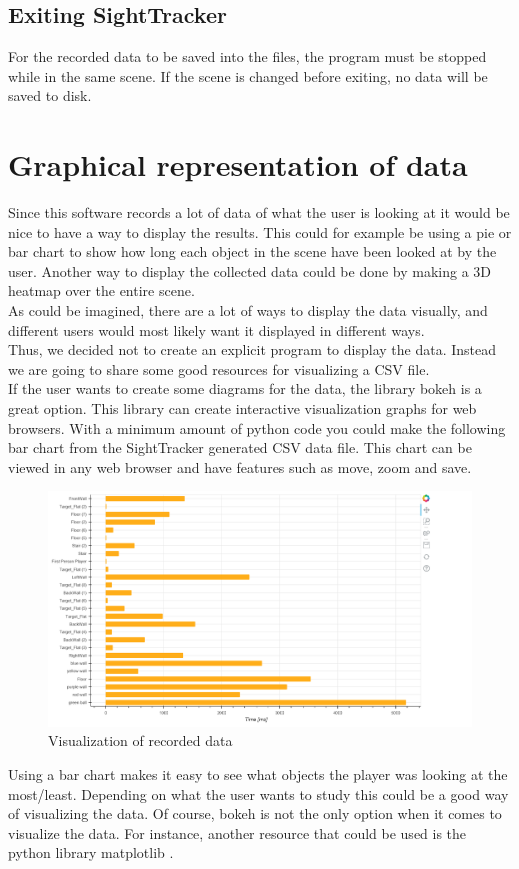 \documentclass[letterpaper]{article}
\begin{document}
\subsection{Exiting SightTracker}
For the recorded data to be saved into the files, the program must be stopped while in the same scene. If the scene is changed before exiting, no data will be saved to disk.
\section{Graphical representation of data}
Since this software records a lot of data of what the user is looking at it would be nice to have a way to display the results. This could for example be using a pie or bar chart to show how long each object in the scene have been looked at by the user. Another way to display the collected data could be done by making a 3D heatmap over the entire scene.\\[0.15in]
As could be imagined, there are a lot of ways to display the data visually, and different users would most likely want it displayed in different ways.\\[0.15in]
Thus, we decided not to create an explicit program to display the data. Instead we are going to share some good resources for visualizing a CSV file.\\[0.15in]
If the user wants to create some diagrams for the data, the library bokeh \cite{bokeh} is a great option. This library can create interactive visualization graphs for web browsers. With a minimum amount of python code you could make the following bar chart from the SightTracker generated CSV data file. This chart can be viewed in any web browser and have features such as move, zoom and save.
\newpage
\begin{figure}[h!]
  \centering \includegraphics[keepaspectratio,scale=0.3]{GraphStuff.png}
  \caption{Visualization of recorded data}
  \label{fig:graphvisualization}
\end{figure}
\noindent Using a bar chart makes it easy to see what objects the player was looking at the most/least. Depending on what the user wants to study this could be a good way of visualizing the data.
Of course, bokeh is not the only option when it comes to visualize the data. For instance, another resource that could be used is the python library matplotlib \cite{matplotlib}.
\newpage
\end{document}
